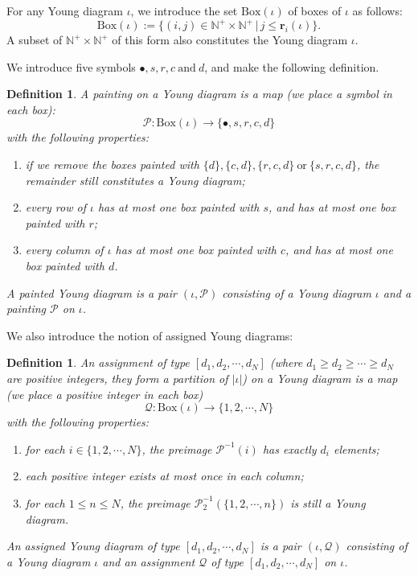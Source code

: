 \documentclass[12pt, a4paper]{amsart}
\numberwithin{equation}{section}
\newtheorem{defn}[thm]{Definition}
\newcommand{\br}{{\mathbf{r}}}
\newcommand{\BN}{{\mathbb {N}}}
\newcommand{\CP}{{\mathcal {P}}}
\newcommand{\CQ}{{\mathcal {Q}}}
\newcommand{\set}[2]{\{#1\,|\,#2\}}
\begin{document}
For any Young diagram $\iota$, we introduce the set $\mathrm{Box}(\iota)$ of boxes of $\iota$ as follows:
\begin{equation}
   \mathrm{Box}(\iota) := \set{(i,j) \in \BN^{+} \times \BN^{+}}{j \leq \br_i(\iota)}.
\end{equation}
A subset of $\BN^{+} \times \BN^{+}$ of this form also constitutes the Young diagram $\iota$.

We introduce five symbols $\bullet, s, r, c \ \textrm{and} \ d$, and make the following definition.

\begin{defn}
   A painting on a Young diagram is a map (we place a symbol in each box):
   $$\CP : \mathrm{Box}(\iota) \to \{ \bullet, s, r ,c ,d \}$$
   with the following properties:

   \begin{enumerate}
      \item if we remove the boxes painted with $\{d\}, \{c,d\}, \{r,c,d\} \ \textrm{or} \  \{s ,r ,c ,d\}$, the remainder still constitutes a Young diagram;
      \item every row of $\iota$ has at most one box painted with $s$, and has at most one box painted with $r$;
      \item every column of $\iota$ has at most one box painted with $c$, and has at most one box painted with $d$.
   \end{enumerate}
   A painted Young diagram is a pair $(\iota, \CP)$ consisting of a Young diagram $\iota$ and a painting $\CP$ on $\iota$.
\end{defn}


We also introduce the notion of assigned Young diagrams:


\begin{defn}
   An assignment of type $[d_1,d_2, \cdots, d_N]$ (where $d_1 \geq d_2 \geq \cdots \geq d_N$ are positive integers, they form a partition of $|\iota|$) on a Young diagram is a map (we place a positive integer in each box)
   $$\CQ: \mathrm{Box}(\iota) \to \{1,2,\cdots,N\} $$
   with the following properties:

   \begin{enumerate}
      \item for each $i \in \{1,2,\cdots,N\}$, the preimage $\CP^{-1}(i)$ has exactly $d_i$ elements;
      \item each positive integer exists at most once in each column;
      \item for each $1 \leq n \leq N$, the preimage $\CP_2^{-1}(\{1,2,\cdots,n\})$ is still a Young diagram.
   \end{enumerate}
   An assigned Young diagram of type $[d_1,d_2, \cdots, d_N]$ is a pair $(\iota,\CQ)$ consisting of a Young diagram $\iota$ and an assignment $\CQ$ of type $[d_1,d_2, \cdots, d_N]$ on $\iota$.
\end{defn}
\end{document}
